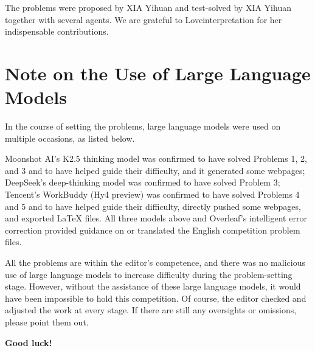 \documentclass[11pt,a4paper]{article}
\begin{document}
The problems were proposed by XIA Yihuan and test-solved by XIA Yihuan
together with several agents. We are grateful to Loveinterpretation for her
indispensable contributions.

\section*{Note on the Use of Large Language Models}

In the course of setting the problems, large language models were used on
multiple occasions, as listed below.

Moonshot AI's K2.5 thinking model was confirmed to have solved Problems 1, 2,
and 3 and to have helped guide their difficulty, and it generated some
webpages; DeepSeek's deep-thinking model was confirmed to have solved
Problem 3; Tencent's WorkBuddy (Hy4 preview) was confirmed to have solved
Problems 4 and 5 and to have helped guide their difficulty, directly pushed
some webpages, and exported LaTeX files. All three models above and
Overleaf's intelligent error correction provided guidance on or translated
the English competition problem files.

All the problems are within the editor's competence, and there was no
malicious use of large language models to increase difficulty during the
problem-setting stage. However, without the assistance of these large
language models, it would have been impossible to hold this competition. Of
course, the editor checked and adjusted the work at every stage. If there are
still any oversights or omissions, please point them out.

\vspace{1em}
\begin{center}
\bfseries Good luck!
\end{center}
\end{document}
